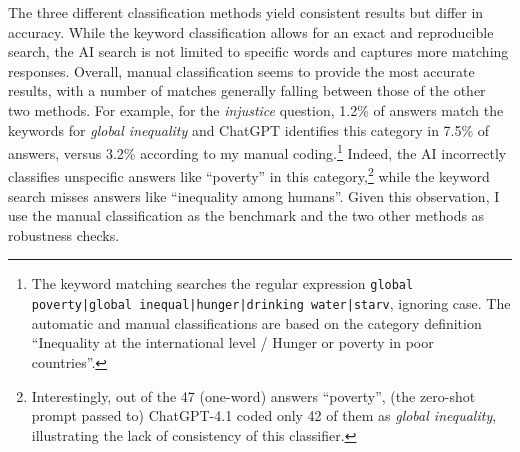 \documentclass[12pt,english]{article}
\begin{document}
The three different classification methods yield consistent results but differ in accuracy. While the keyword classification allows for an exact and reproducible search, the AI search is not limited to specific words and captures more matching responses. %
Overall, manual classification seems to provide the most accurate results, with a number of matches generally falling between those of the other two methods. 
For example, for the \textit{injustice} question, 1.2\% of answers match the keywords for \textit{global inequality} and ChatGPT identifies this category in 7.5\% of answers, versus 3.2\% according to my manual coding.\footnote{The keyword matching searches the regular expression \texttt{global poverty\allowbreak|global inequal\allowbreak|hunger|drinking water|starv}, ignoring case. The automatic and manual classifications are based on the category definition ``Inequality at the international %
level / Hunger or poverty in poor countries''.} 
Indeed, the AI incorrectly classifies unspecific answers like ``poverty'' in this category,\footnote{Interestingly, out of the 47  (one-word) answers ``poverty'', (the zero-shot prompt passed to) ChatGPT-4.1 coded only 42 of them as \textit{global inequality}, illustrating the lack of consistency of this classifier.} while the keyword search misses answers like ``inequality among humans''. 
Given this observation, I use the manual classification as the benchmark and the two other methods as robustness checks.
\end{document}

